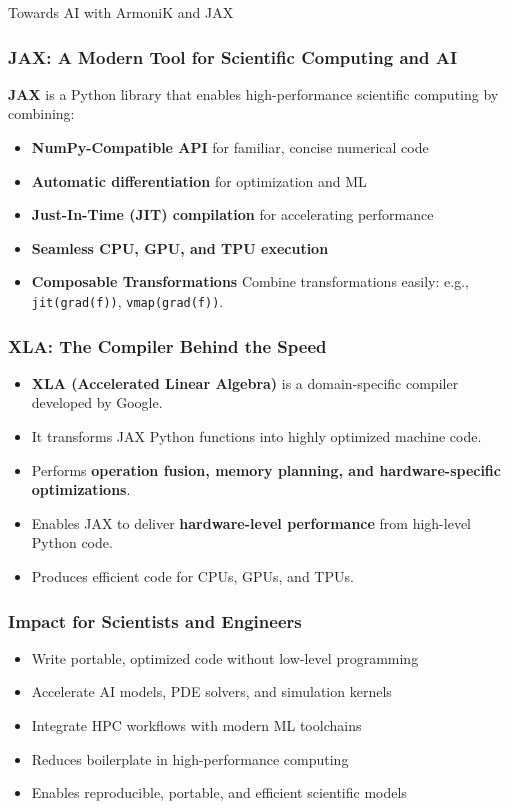 \documentclass[10pt,aspectratio=1609]{beamer}
\begin{document}
\begin{section}{Towards AI with ArmoniK and JAX}
 \begin{frame}
   \frametitle{JAX: A Modern Tool for Scientific Computing and AI}
   \textbf{JAX} is a Python library that enables high-performance scientific computing by combining:
   \begin{itemize}
     \item \textbf{NumPy-Compatible API} for familiar, concise numerical code
     \item \textbf{Automatic differentiation} for optimization and ML
     \item \textbf{Just-In-Time (JIT) compilation} for accelerating performance
     \item \textbf{Seamless CPU, GPU, and TPU execution}
     \item \textbf{Composable Transformations} Combine transformations easily: e.g., \texttt{jit(grad(f))}, \texttt{vmap(grad(f))}.
   \end{itemize}
 \end{frame}

 \begin{frame}
   \frametitle{XLA: The Compiler Behind the Speed}
   \begin{itemize}
     \item \textbf{XLA (Accelerated Linear Algebra)} is a domain-specific compiler developed by Google.
     \item It transforms JAX Python functions into highly optimized machine code.
     \item Performs \textbf{operation fusion, memory planning, and hardware-specific optimizations}.
     \item Enables JAX to deliver \textbf{hardware-level performance} from high-level Python code.
     \item Produces efficient code for CPUs, GPUs, and TPUs.
   \end{itemize}
 \end{frame}

 \begin{frame}
   \frametitle{Impact for Scientists and Engineers}
   \begin{itemize}
     \item Write portable, optimized code without low-level programming
     \item Accelerate AI models, PDE solvers, and simulation kernels
     \item Integrate HPC workflows with modern ML toolchains
     \item Reduces boilerplate in high-performance computing
     \item Enables reproducible, portable, and efficient scientific models
   \end{itemize}
 \end{frame}


\end{section}
\end{document}
